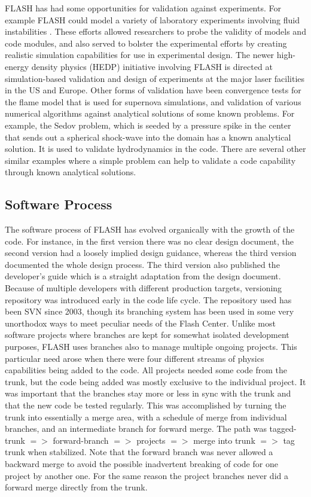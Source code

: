 FLASH has had some opportunities for validation against
experiments. For example FLASH could model a variety of laboratory
experiments involving fluid instabilities
\cite{Dimonte2004,Kane2001}. These efforts allowed researchers to
probe the validity of models and code modules, and also served to
bolster the experimental efforts by creating realistic simulation
capabilities for use in experimental design. The newer high-energy
density physics (HEDP) initiative involving FLASH  
is directed at simulation-based validation and design of
experiments at the major laser facilities in the US and
Europe. Other forms of validation have been convergence tests for the
flame model that is used for supernova simulations, and validation of
various numerical algorithms against analytical solutions of some
known problems. For example, the Sedov \cite{sedov} problem, which is
seeded by a pressure spike in the center that sends out a spherical
shock-wave into the domain has a known analytical solution. It is used
to validate hydrodynamics in the code. There are several other similar
examples where a simple problem can help to validate a code capability
through known analytical solutions. 

\subsection{Software Process}
\label{sec:FLASHSoftwareProcess} 
The software process of FLASH has evolved organically with the growth
of the code. For instance, in the first version there was no clear
design document, the second version had a loosely implied design
guidance, whereas the third version documented the whole design
process. The third version also published the developer's guide which
is a straight adaptation from the design document. Because of multiple
developers with different production targets, versioning repository was
introduced early in the code life cycle. The repository used has been
SVN since 2003, though its branching system has been used in some very
unorthodox ways to meet peculiar needs of the Flash Center. Unlike
most software projects where branches are kept for somewhat isolated
development purposes, FLASH uses branches also to manage multiple
ongoing projects. This particular need arose when there were four
different streams of physics capabilities being added to the code. All
projects needed some code from the trunk, but the code being added was
mostly exclusive to the individual project. It was important that the
branches stay more or less in sync with the trunk and that the new
code be tested regularly. This was accomplished by turning the trunk
into essentially a merge area, with a schedule of merge from 
individual branches, and an intermediate branch for forward merge. The
path was tagged-trunk $=>$ forward-branch $=>$ projects $=>$ merge into
trunk $=>$ tag trunk when stabilized. Note that the forward branch was
never allowed a backward merge to avoid the possible inadvertent
breaking of code for one project by another one. For the same reason
the project branches never did a forward merge directly from the
trunk. 

